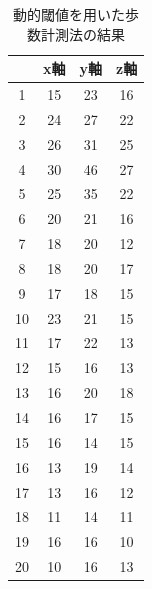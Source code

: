 \begin{table}[htb]
  \begin{center}
    \caption{動的閾値を用いた歩数計測法の結果}
    \label{data5}
    \begin{tabular}{|c|c|c|c|} \hline
      &x軸 & y軸 & z軸  \\ \hline \hline
      1 &	15 &	23 &	16  \\ \hline
      2 &	24 &	27 &	22  \\ \hline
      3 &	26 &	31 &	25  \\ \hline
      4 &	30 &	46 &	27  \\ \hline
      5 &	25 &	35 &	22  \\ \hline
      6 &	20 &	21 &	16  \\ \hline
      7 &	18 &	20 &	12  \\ \hline
      8 &	18 &	20 &	17  \\ \hline
      9 &	17 &	18 &	15  \\ \hline
      10 &	23 &	21 &	15  \\ \hline
      11 &	17 &	22 &	13  \\ \hline
      12 &	15 &	16 &	13  \\ \hline
      13 &	16 &	20 &	18  \\ \hline
      14 &	16 &	17 &	15  \\ \hline
      15 &	16 &	14 &	15  \\ \hline
      16 &	13 &	19 &	14  \\ \hline
      17 &	13 &	16 &	12  \\ \hline
      18 &	11 &	14 &	11  \\ \hline
      19 &	16 &	16 &	10  \\ \hline
      20 &	10 &	16 &	13  \\ \hline
    \end{tabular}
  \end{center}
\end{table}